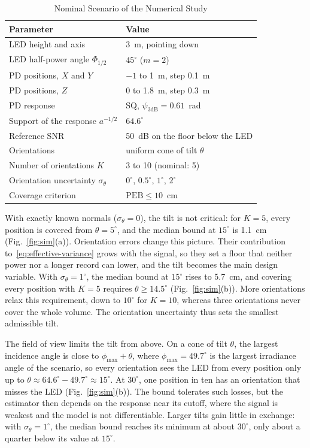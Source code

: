 \begin{table}[!t]
 \centering
 \caption{Nominal Scenario of the Numerical Study}
 \label{tab:scenario}
 \footnotesize
 \setlength{\tabcolsep}{3pt}
 \begin{tabular}{@{}ll@{}}
 \toprule
 Parameter & Value\\
 \midrule
 LED height and axis & 3~m, pointing down\\
 LED half-power angle $\Phi_{1/2}$ & $45^\circ$ ($m=2$)\\
 PD positions, $X$ and $Y$ & $-1$ to 1~m, step 0.1~m\\
 PD positions, $Z$ & 0 to 1.8~m, step 0.3~m\\
 PD response & SQ, $\psi_{3\mathrm{dB}}=0.61$~rad~\cite{Bastiaens2020}\\
 Support of the response $a^{-1/2}$ & $64.6^\circ$\\
 Reference SNR & 50~dB on the floor below the LED\\
 Orientations & uniform cone of tilt $\theta$\\
 Number of orientations $K$ & 3 to 10 (nominal: 5)\\
 Orientation uncertainty $\sigma_\theta$ & $0^\circ$, $0.5^\circ$, $1^\circ$, $2^\circ$\\
 Coverage criterion & $\mathrm{PEB}\le10$~cm\\
 \bottomrule
 \end{tabular}
\end{table}

With exactly known normals ($\sigma_\theta=0$), the tilt is not critical: for $K=5$, every position is covered from $\theta=5^\circ$, and the median bound at $15^\circ$ is 1.1~cm (Fig.~\ref{fig:sim}(a)). Orientation errors change this picture. Their contribution to~\eqref{eq:effective-variance} grows with the signal, so they set a floor that neither power nor a longer record can lower, and the tilt becomes the main design variable. With $\sigma_\theta=1^\circ$, the median bound at $15^\circ$ rises to 5.7~cm, and covering every position with $K=5$ requires $\theta\ge14.5^\circ$ (Fig.~\ref{fig:sim}(b)). More orientations relax this requirement, down to $10^\circ$ for $K=10$, whereas three orientations never cover the whole volume. The orientation uncertainty thus sets the smallest admissible tilt.

The field of view limits the tilt from above. On a cone of tilt $\theta$, the largest incidence angle is close to $\phi_{\max}+\theta$, where $\phi_{\max}=49.7^\circ$ is the largest irradiance angle of the scenario, so every orientation sees the LED from every position only up to $\theta\approx64.6^\circ-49.7^\circ\approx15^\circ$. At $30^\circ$, one position in ten has an orientation that misses the LED (Fig.~\ref{fig:sim}(b)). The bound tolerates such losses, but the estimator then depends on the response near its cutoff, where the signal is weakest and the model is not differentiable. Larger tilts gain little in exchange: with $\sigma_\theta=1^\circ$, the median bound reaches its minimum at about $30^\circ$, only about a quarter below its value at $15^\circ$.

